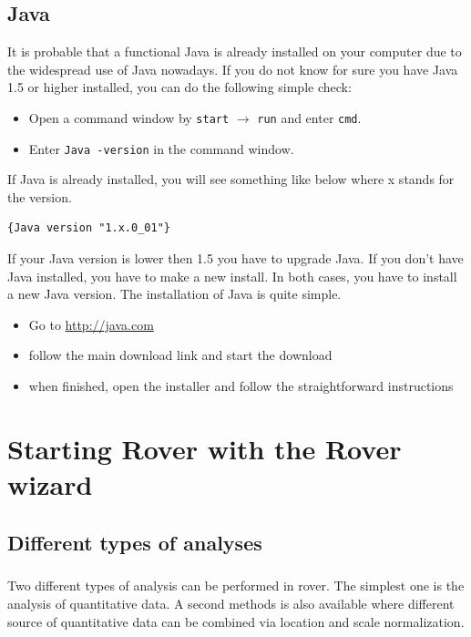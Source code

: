 \documentclass[11pt,a4paper,oneside,notitlepage]{book}
\begin{document}
\section{Java}
	It is probable that a functional Java is already installed on your computer due to the widespread use of Java nowadays. If you do not know for sure you have Java 1.5 or higher installed, you can do the following simple check:
	\begin{itemize}
		\item Open a command window by \texttt{start} $\rightarrow$ \texttt{run} and enter \texttt{cmd}.
		\item Enter \texttt{Java -version} in the command window.
	\end{itemize}	
	If Java is already installed, you will see something like below where x stands for the version.\begin{verbatim}{Java version "1.x.0_01"}\end{verbatim}
	If your Java version is lower then 1.5 you have to upgrade Java. If you don't have Java installed, you have to make a new install. 
	In both cases, you have to install a new Java version. The installation of Java is quite simple.
	\begin{itemize}
	\item Go to \url{http://java.com}
	\item follow the main download link and start the download
	\item when finished, open the installer and follow the straightforward instructions
\end{itemize}	


\chapter{Starting Rover with the Rover wizard}\label{wizard}

\section{Different types of analyses}
\paragraph{}Two different types of analysis can be performed in rover. The simplest one is the analysis of quantitative data. A second methods is also available where different source of quantitative data can be combined via location and scale normalization.
\end{document}

